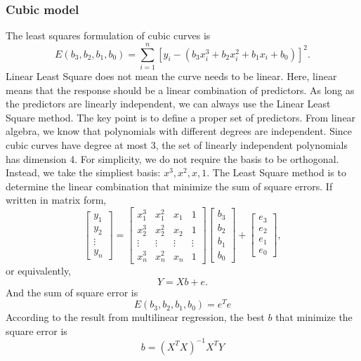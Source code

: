 \subsubsection{Cubic model}
The least squares formulation of cubic curves is
\begin{equation}
E(b_3,b_2,b_1,b_0)=\sum_{i=1}^{n}\left[y_i-\left(b_3 x_i^3 + b_2 x_i^2 + b_1 x_i + b_0 \right)\right]^2.
\end{equation}
Linear Least Square does not mean the curve needs to be linear.
Here, linear means that the response should be a linear combination of predictors.
As long as the predictors are linearly independent, we can always use the Linear Least Square method.
The key point is to define a proper set of predictors.
From linear algebra, we know that polynomials with different degrees are independent.
Since cubic curves have degree at most 3, the set of linearly independent polynomials has dimension 4.
For simplicity, we do not require the basis to be orthogonal.
Instead, we take the simpliest basis: \(x^3, x^2, x, 1\).
The Least Square method is to determine the linear combination that minimize the sum of square errors.
If written in matrix form,
\begin{equation}
\begin{bmatrix}
y_1 \\ y_2 \\ \vdots \\ y_n
\end{bmatrix}
=
\begin{bmatrix}
x_1^3 & x_1^2 & x_1 & 1 \\
x_2^3 & x_2^2 & x_2 & 1 \\
\vdots & \vdots & \vdots & \vdots \\
x_n^3 & x_n^2 & x_n & 1
\end{bmatrix}
\begin{bmatrix}
b_3 \\ b_2 \\ b_1 \\ b_0
\end{bmatrix}
+
\begin{bmatrix}
e_3 \\ e_2 \\ e_1 \\ e_0
\end{bmatrix},
\end{equation}
or equivalently,
\begin{equation}
Y=Xb+e.
\end{equation}
And the sum of square error is
\begin{equation}
E(b_3,b_2,b_1,b_0)=e^Te
\end{equation}
According to the result from multilinear regression, the best \(b\) that minimize the square error is
\begin{equation}
b=\left(X^T X\right)^{-1}X^TY
\end{equation}


